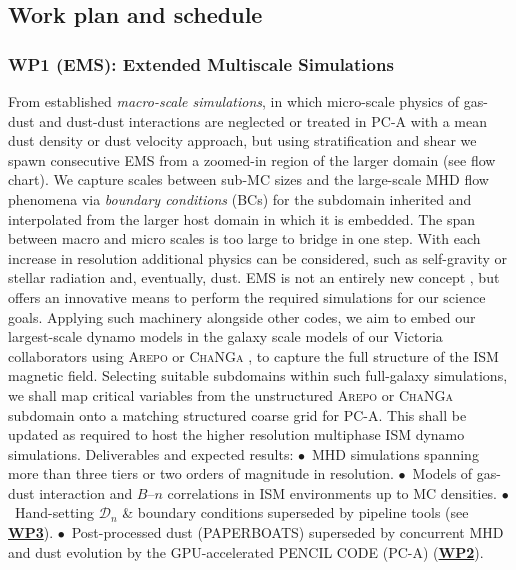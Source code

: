 \documentclass[a4paper,12pt]{article}
\newcommand{\wpdef}[3]{\hypertarget{wp#1}{\subsubsection*{WP#1 {\normalfont(#2)}: #3}}}
\newcommand{\wpref}[1]{\protect\hyperlink{wp#1}{\textbf{WP#1}}}
\begin{document}
\subsection{Work plan and schedule}\label{wplan}

\wpdef{1}{EMS}{Extended Multiscale Simulations}
\vspace{-0.3cm}
From established {\textit{macro-scale simulations}}, in which 
micro-scale physics of gas-dust and dust-dust interactions are neglected or
treated in \textsc{PC-A} with a mean dust density or dust velocity
approach, but using stratification and shear we spawn consecutive EMS
from a zoomed-in region of the larger domain (see flow chart). We capture
scales between sub-MC sizes and the large-scale MHD flow phenomena via
\textit{boundary conditions} (BCs) for the subdomain inherited and interpolated from
the larger host domain in which it is embedded.  The span between
macro and micro scales is too large to bridge in one step. With each increase
in resolution additional physics can be considered, such as self-gravity \citep[recently added to PC-A]{Ruben26}  or
stellar radiation and, eventually, dust.  EMS is not an entirely new concept
\citep{EMS2023,EMS2024}, but offers an innovative means to perform the required
simulations for our science goals.
Applying such machinery alongside other codes, we aim to embed our
largest-scale dynamo models in the galaxy scale models of our
Victoria collaborators using \textsc{Arepo} or \textsc{ChaNGa}
\citep{Babul21L,Babul21a}, to capture the full structure of the ISM
magnetic field.  Selecting suitable subdomains within such full-galaxy
simulations, we shall map critical variables from the unstructured
\textsc{Arepo} or \textsc{ChaNGa} subdomain onto a matching structured coarse
grid for PC-A. This shall be updated as required to host the higher resolution
multiphase ISM dynamo simulations.
%
\tabto{0em}
Deliverables and expected results:
\tabto{0em}
$\bullet$~MHD simulations spanning more than three tiers or two orders of
magnitude in resolution.
\tabto{0em}
$\bullet$~Models of gas-dust interaction and $B$--$n$ correlations in ISM
environments up to MC densities.  \tabto{0em}
$\bullet$~Hand-setting $\mathcal{D}_n$ \& boundary conditions superseded by
pipeline tools (see \wpref{3}).  \tabto{0em}
$\bullet$~Post-processed dust (\textsc{PAPERBOATS}) superseded by concurrent
MHD and dust evolution by the GPU-accelerated \textsc{PENCIL CODE} (PC-A) (\wpref{2}).
\end{document}
